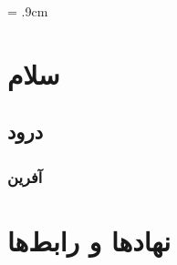 \documentclass{report}
\begin{document}
\baselineskip = .9cm
\tableofcontents

\chapter{سلام}
\section{درود}
\subsection{آفرین}

\appendix
\chapter{نهادها و رابط‌ها}
\end{document}
